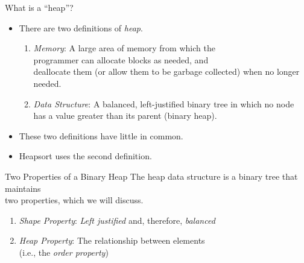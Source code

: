 \documentclass[14pt,aspectratio=1610]{beamer}
\begin{document}
\begin{frame}{What is a ``heap''?}
\begin{itemize}[<+->]
\item
  There are two definitions of \emph{heap}.
  \begin{enumerate}
  \item
    \emph{Memory}: A large area of memory from which the \\
    programmer can allocate blocks as needed, and \\
    deallocate them (or allow them to be garbage collected) when no longer needed.
  \item
    \emph{Data Structure}: A balanced, left-justified binary tree in which no node has a value greater than its parent (binary heap).
  \end{enumerate}
\item
  These two definitions have little in common.
\item
  Heapsort uses the second definition.
\end{itemize}
\end{frame}

\begin{frame}{Two Properties of a Binary Heap}
The heap data structure is a binary tree that maintains\\
two properties, which we will discuss.\\[1em]
\begin{enumerate}
\item
  \emph{Shape Property}: \textit{Left justified} and, therefore, \textit{balanced}
\item
  \emph{Heap Property}: The relationship between elements\\ (i.e., the \emph{order property})
\end{enumerate}
\end{frame}
\end{document}
